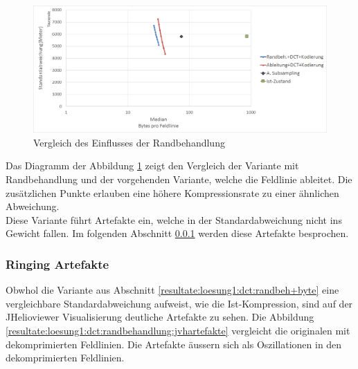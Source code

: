 \begin{figure}[!htbp]
	\center	\includegraphics[width=1\textwidth,keepaspectratio]{./pictures/resultate/loesung1/loesung1-7/loesung1_7.png}
	\caption{Vergleich des Einflusses der Randbehandlung}
	\label{resultate:loesung1:dct:randbehandlung}
\end{figure}
Das Diagramm der Abbildung \ref{resultate:loesung1:dct:randbehandlung} zeigt den Vergleich der Variante mit Randbehandlung und der vorgehenden Variante, welche die Feldlinie ableitet. Die zusätzlichen Punkte erlauben eine höhere Kompressionsrate zu einer ähnlichen Abweichung.\\
Diese Variante führt Artefakte ein, welche in der Standardabweichung nicht ins Gewicht fallen. Im folgenden Abschnitt \ref{resultate:loesung1:ringing} werden diese Artefakte besprochen.

\subsubsection{Ringing Artefakte}\label{resultate:loesung1:ringing}
Obwhol die Variante aus Abschnitt \ref{resultate:loesung1:dct:randbeh+byte} eine vergleichbare Standardabweichung aufweist, wie die Ist-Kompression, sind auf der JHelioviewer Visualisierung deutliche Artefakte zu sehen. Die Abbildung \ref{resultate:loesung1:dct:randbehandlung:jvhartefakte} vergleicht die originalen mit dekomprimierten Feldlinien. Die Artefakte äussern sich als Oszillationen in den dekomprimierten Feldlinien.


